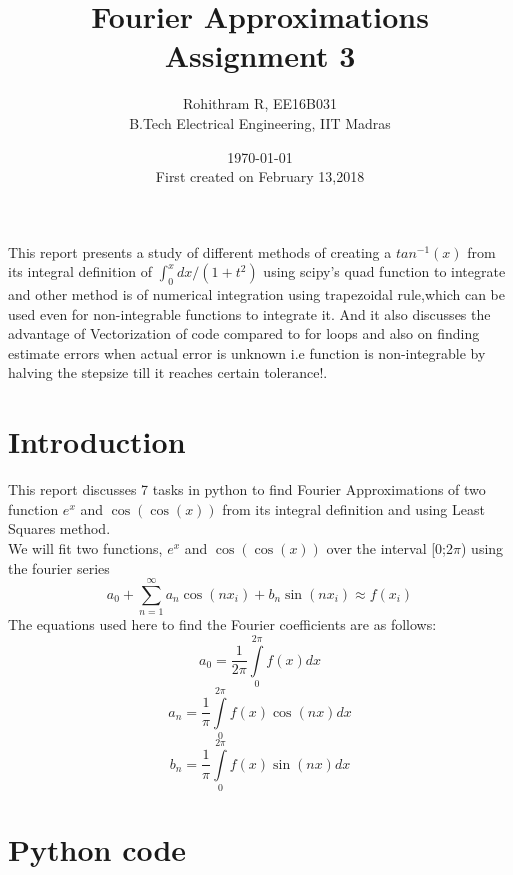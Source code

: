\documentclass[a4paper]{article}
\title{Fourier Approximations \\ Assignment 3}
\author{Rohithram R, EE16B031 \\ B.Tech Electrical Engineering, IIT Madras}
\date{\today \\ First created on February 13,2018}
\begin{document}
    
    
    \maketitle
    
    \begin{abstract}    
	\end{abstract}
	This report presents a study of different methods of creating a  $tan^{-1}(x)$ from its integral definition of $\int_{0}^{x} dx/(1+t^{2})$ using scipy's quad function to integrate and other method is of numerical integration using trapezoidal rule,which can be used even for non-integrable functions to integrate it.
	And it also discusses the advantage of Vectorization of code compared to for loops and also on finding estimate errors when actual error is unknown i.e function is non-integrable by halving the stepsize till it reaches certain tolerance!.	
	\section{Introduction}
	This report discusses 7 tasks in python to find Fourier Approximations of two function $e^{x}$ and $\cos(\cos(x))$ from its integral definition and using Least Squares method.\\
	We will fit two functions, $e^{x}$ and $\cos(\cos(x))$ over the interval [0;2$\pi$) using the fourier series
 	\begin{equation}
    a_{0} + \sum\limits_{n=1}^{\infty} {{a_{n}\cos(nx_{i})+b_{n}\sin(nx_{i})}} \approx f(x_{i}) 
    \end{equation}
    	The equations used here to find the Fourier coefficients are as follows:
    \begin{equation}
         a_{0} = \frac{1}{2\pi}\int\limits_{0}^{2\pi} f(x)dx 
    \end{equation}
    \begin{equation}
         a_{n} = \frac{1}{\pi}\int\limits_{0}^{2\pi} f(x)\cos(nx)dx 
    \end{equation}
    \begin{equation}
         b_{n} = \frac{1}{\pi}\int\limits_{0}^{2\pi} f(x)\sin(nx)dx 
    \end{equation}
	
    \section{Python code}   
        
\end{document}
